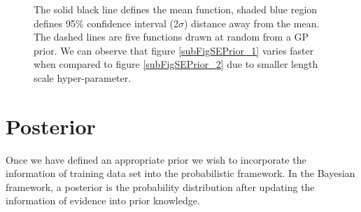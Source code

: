 \begin{figure}[!ht]
  \centering
    \quad
{}\quad
  
       \caption{The solid black line defines the mean function, shaded blue region defines 95\% confidence interval (2\(\sigma\)) distance away from the mean. The dashed lines are five functions drawn at random from a GP prior. We can observe that figure \ref{subFigSEPrior_1} varies faster when compared to figure \ref{subFigSEPrior_2} due to smaller length scale hyper-parameter.       }\label{figGPPriors}
\end{figure}



\section{Posterior}\label{secPosterior}
Once we have defined an appropriate prior we wish to incorporate the information of training data set into the probabilistic framework. In the Bayesian framework, a posterior is the probability distribution after updating the information of evidence into prior knowledge. 


